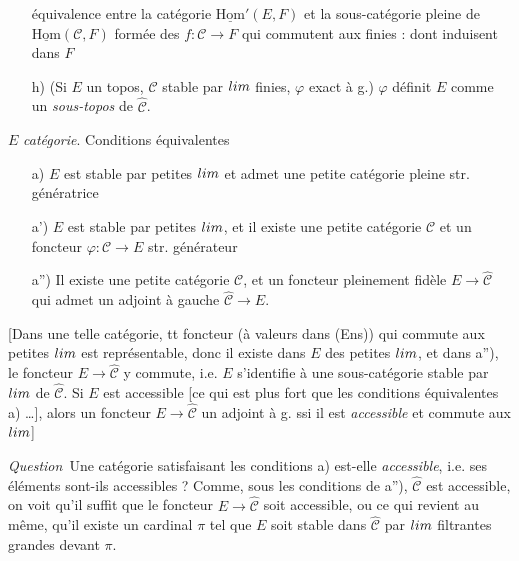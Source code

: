 \documentclass[11pt,a4paper]{article}
\begin{document}
\begin{itemize}
    équivalence entre la catégorie $\underline{\mathrm{Hom}}'(E, F)$ et la
    sous-catégorie pleine de $\underline{\mathrm{Hom}}(\mathcal{C}, F)$
    formée des $f : \mathcal{C} \to F$ \ill{} qui commutent aux \ill{}
    \add{$\varinjlim$} finies : \ill{} dont \ill{} induisent \ill{} dans
    $F$ \ill{}
  \item[] 
  \item[h)] \struck{\ill{}} (Si $E$ un topos, $\mathcal{C}$ stable par
    $\varprojlim$ finies, $\varphi$ exact à g.) $\varphi$ définit $E$ comme
    un \emph{sous-topos} de $\hat{\mathcal{C}}$.
  \item[] 
\end{itemize}

$E$ \emph{catégorie}. Conditions équivalentes
\begin{itemize}
  \item[a)]  $E$ est stable par petites $\varinjlim$ et
    admet une petite catégorie pleine str. génératrice
  \item[a')] $E$ est stable par petites $\varinjlim$, et il existe une petite
    catégorie $\mathcal{C}$ et un foncteur $\varphi : \mathcal{C} \to E$
    str. générateur
  \item[a'')] Il existe une petite catégorie $\mathcal{C}$, et un foncteur
    pleinement fidèle $E \to \hat{\mathcal{C}}$ qui admet un adjoint à gauche
    $\hat{\mathcal{C}} \to E$.
\end{itemize}
[Dans une telle catégorie, tt foncteur  (à valeurs dans
(Ens)) qui commute aux petites $\varinjlim$ est représentable, donc il existe
dans $E$ des petites $\varprojlim$, et dans a''), le foncteur $E \to
\hat{\mathcal{C}}$ y commute, i.e. $E$ s'identifie à une sous-catégorie
stable par $\varprojlim$ de $\hat{\mathcal{C}}$. Si $E$ est accessible [ce
qui est plus fort que les conditions équivalentes a) …], alors
\struck{\ill{}} un foncteur $E \to \hat{\mathcal{C}}$ \add{\ill{}} un adjoint
à g. ssi il est \emph{accessible} et commute aux 
$\varprojlim$]

\emph{Question}\ Une catégorie satisfaisant les conditions a) est-elle
\emph{accessible}, i.e. ses éléments sont-ils accessibles ? Comme, sous
les conditions de a''), $\hat{\mathcal{C}}$ est accessible, on voit qu'il
 suffit que le foncteur $E \to \hat{\mathcal{C}}$ soit
accessible, ou ce qui revient au même, qu'il existe un cardinal $\pi$ tel que
$E$ soit stable dans $\hat{\mathcal{C}}$ par $\varinjlim$ filtrantes grandes
devant $\pi$.
\end{document}
